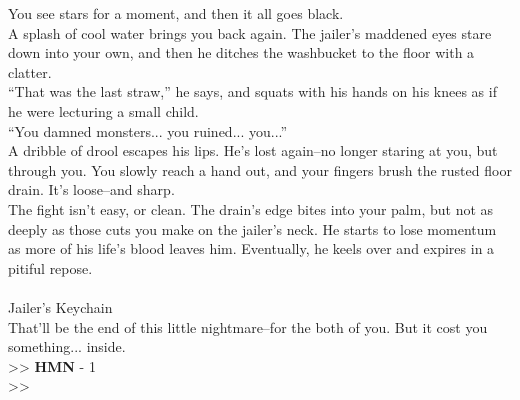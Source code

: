 You see stars for a moment, and then it all goes black.\\

A splash of cool water brings you back again. The jailer’s maddened eyes stare down into your own, and then he ditches the washbucket to the floor with a clatter.\\

“That was the last straw,” he says, and squats with his hands on his knees as if he were lecturing a small child.\\

“You damned monsters... you ruined... you...”\\

A dribble of drool escapes his lips. He’s lost again--no longer staring at you, but through you. You slowly reach a hand out, and your fingers brush the rusted floor drain. It’s loose--and sharp.\\

The fight isn’t easy, or clean. The drain’s edge bites into your palm, but not as deeply as those cuts you make on the jailer's neck. He starts to lose momentum as more of his life’s blood leaves him. Eventually, he keels over and expires in a pitiful repose.\\
\\
 Jailer’s Keychain\\

That’ll be the end of this little nightmare--for the both of you. But it cost you something... inside.\\
>> \textbf{HMN} - 1\\
>>